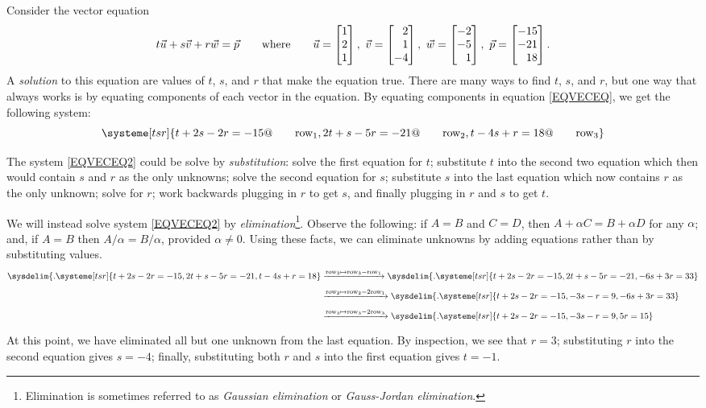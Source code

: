 	Consider the vector equation
	\begin{equation}\label{EQVECEQ}
		t\vec u+s\vec v+r\vec w = \vec p\qquad\text{where}\qquad \vec u=\mat{1\\2\\1},\ 
		\vec v=\mat{2\\1\\-4},\ \vec w=\mat{-2\\-5\\1},\ \vec p=\mat{-15\\-21\\18}.
	\end{equation}
	A \emph{solution} to this equation are values of $t$, $s$, and $r$ that make the equation true.
	There are many ways to find $t$, $s$, and $r$, but one way that always works is by
	equating components of each vector in the equation. By equating components in equation
	\eqref{EQVECEQ}, we get the following system:
	\begin{equation}
		\label{EQVECEQ2}
		\systeme[tsr]{
			t+2s-2r=-15@\qquad\text{row}_1,
			2t+s-5r=-21@\qquad\text{row}_2,
			t-4s+r=18@\qquad\text{row}_3
		}
	\end{equation}

	The system \eqref{EQVECEQ2} could be solve by \emph{substitution}:
	solve the first equation for $t$; substitute $t$ into the second two equation
	which then would contain $s$ and $r$ as the only unknowns; solve the second
	equation for $s$; substitute $s$ into the last equation which now contains
	$r$ as the only unknown; solve for $r$; work backwards plugging in $r$ to get $s$,
	and finally plugging in $r$ and $s$ to get $t$.

	We will instead solve system \eqref{EQVECEQ2} by \emph{elimination}\footnote{
	Elimination is sometimes referred to as \emph{Gaussian elimination}
	or \emph{Gauss-Jordan elimination}.}.  Observe the following: if $A=B$ and
	$C=D$, then $A+ \alpha C=B+\alpha D$ for any $\alpha$; and, 
	if $A=B$ then $A/\alpha=B/\alpha$, provided $\alpha\neq 0$.
	Using these facts, we can eliminate unknowns by adding equations rather than by
	substituting values.
	\begin{align*}
	\sysdelim\{.
		\systeme[tsr]{
			t+2s-2r=-15,
			2t+s-5r=-21,
			t-4s+r=18
		}
		&\xrightarrow{\text{row}_3\mapsto\text{row}_3-\text{row}_1}
	\sysdelim\{.
		\systeme[tsr]{
			t+2s-2r=-15,
			2t+s-5r=-21,
			-6s+3r=33
		}\\[4pt]
		&\xrightarrow{\text{row}_2\mapsto\text{row}_2-2\text{row}_1}
	\sysdelim\{.
		\systeme[tsr]{
			t+2s-2r=-15,
			-3s-r=9,
			-6s+3r=33
		}\\[4pt]
		&\xrightarrow{\text{row}_3\mapsto\text{row}_3-2\text{row}_3}
	\sysdelim\{.
		\systeme[tsr]{
			t+2s-2r=-15,
			-3s-r=9,
			  5r=15
		}\\[4pt]
	\end{align*}
	At this point, we have eliminated all but one unknown from
	the last equation. By inspection, we see that $r=3$; substituting 
	$r$ into the second equation gives $s=-4$; finally, substituting both
	$r$ and $s$ into the first equation gives $t=-1$.

